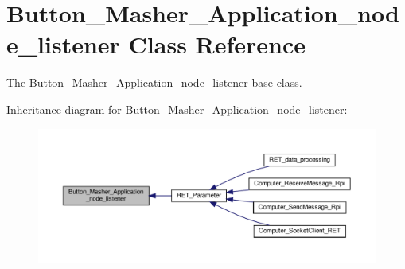 \hypertarget{classButton__Masher__Application__Output_1_1Button__Masher__Application__node__listener}{}\section{Button\+\_\+\+Masher\+\_\+\+Application\+\_\+node\+\_\+listener Class Reference}
\label{classButton__Masher__Application__Output_1_1Button__Masher__Application__node__listener}


The \hyperlink{classButton__Masher__Application__Output_1_1Button__Masher__Application__node__listener}{Button\+\_\+\+Masher\+\_\+\+Application\+\_\+node\+\_\+listener} base class.  




Inheritance diagram for Button\+\_\+\+Masher\+\_\+\+Application\+\_\+node\+\_\+listener\+:
\nopagebreak
\begin{figure}[H]
\begin{center}
\leavevmode
\includegraphics[width=350pt]{classButton__Masher__Application__Output_1_1Button__Masher__Application__node__listener__inherit__graph}
\end{center}
\end{figure}

